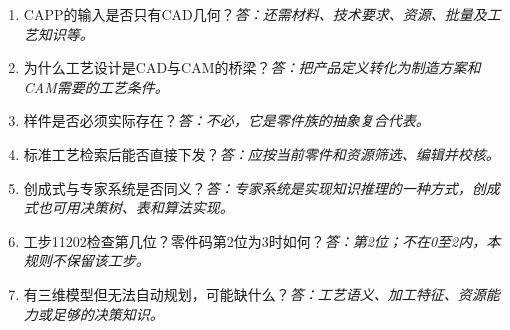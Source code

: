 \begin{enumerate}
\item CAPP的输入是否只有CAD几何？\textit{答：还需材料、技术要求、资源、批量及工艺知识等。}
\item 为什么工艺设计是CAD与CAM的桥梁？\textit{答：把产品定义转化为制造方案和CAM需要的工艺条件。}
\item 样件是否必须实际存在？\textit{答：不必，它是零件族的抽象复合代表。}
\item 标准工艺检索后能否直接下发？\textit{答：应按当前零件和资源筛选、编辑并校核。}
\item 创成式与专家系统是否同义？\textit{答：专家系统是实现知识推理的一种方式，创成式也可用决策树、表和算法实现。}
\item 工步11202检查第几位？零件码第2位为3时如何？\textit{答：第2位；不在0至2内，本规则不保留该工步。}
\item 有三维模型但无法自动规划，可能缺什么？\textit{答：工艺语义、加工特征、资源能力或足够的决策知识。}
\end{enumerate}
